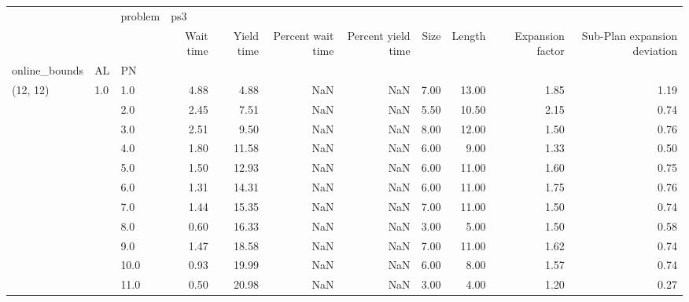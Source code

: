 \begin{tabular}{lllrrrrrrrr}
\toprule
       &     & problem & \multicolumn{8}{l}{ps3} \\
       &     & {} & Wait time & Yield time & Percent wait time & Percent yield time & Size & Length & Expansion factor & Sub-Plan expansion deviation \\
online\_bounds & AL & PN &           &            &                   &                    &      &        &                  &                              \\
\midrule
(12, 12) & 1.0 & 1.0  &      4.88 &       4.88 &               NaN &                NaN & 7.00 &  13.00 &             1.85 &                         1.19 \\
       &     & 2.0  &      2.45 &       7.51 &               NaN &                NaN & 5.50 &  10.50 &             2.15 &                         0.74 \\
       &     & 3.0  &      2.51 &       9.50 &               NaN &                NaN & 8.00 &  12.00 &             1.50 &                         0.76 \\
       &     & 4.0  &      1.80 &      11.58 &               NaN &                NaN & 6.00 &   9.00 &             1.33 &                         0.50 \\
       &     & 5.0  &      1.50 &      12.93 &               NaN &                NaN & 6.00 &  11.00 &             1.60 &                         0.75 \\
       &     & 6.0  &      1.31 &      14.31 &               NaN &                NaN & 6.00 &  11.00 &             1.75 &                         0.76 \\
       &     & 7.0  &      1.44 &      15.35 &               NaN &                NaN & 7.00 &  11.00 &             1.50 &                         0.74 \\
       &     & 8.0  &      0.60 &      16.33 &               NaN &                NaN & 3.00 &   5.00 &             1.50 &                         0.58 \\
       &     & 9.0  &      1.47 &      18.58 &               NaN &                NaN & 7.00 &  11.00 &             1.62 &                         0.74 \\
       &     & 10.0 &      0.93 &      19.99 &               NaN &                NaN & 6.00 &   8.00 &             1.57 &                         0.74 \\
       &     & 11.0 &      0.50 &      20.98 &               NaN &                NaN & 3.00 &   4.00 &             1.20 &                         0.27 \\

\end{tabular}
